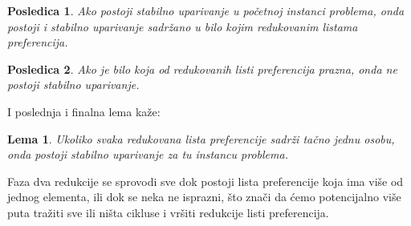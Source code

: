 \documentclass[a4paper]{article}
\newtheorem{lemma}{Lema}
\newtheorem{corollary}{Posledica}[lemma]  %
\begin{document}
\begin{corollary}
        Ako postoji stabilno uparivanje u početnoj instanci problema, onda postoji i stabilno uparivanje sadržano u bilo kojim redukovanim listama preferencija.
\end{corollary}

\begin{corollary}
        Ako je bilo koja od redukovanih listi preferencija prazna, onda ne postoji stabilno uparivanje.        
\end{corollary}

I poslednja i finalna lema kaže:

\begin{lemma}
    Ukoliko svaka redukovana lista preferencije sadrži tačno jednu osobu, onda postoji stabilno uparivanje za tu instancu problema.
\end{lemma}


Faza dva redukcije se sprovodi sve dok postoji lista preferencije koja ima više od jednog elementa, ili dok se neka ne isprazni, što znači da ćemo potencijalno više puta tražiti sve ili ništa cikluse i vršiti redukcije listi preferencija.

\newpage
\end{document}
